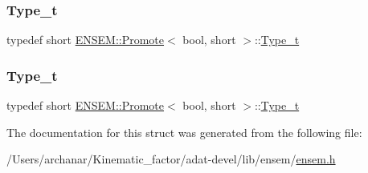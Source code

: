 \mbox{\label{structENSEM_1_1Promote_3_01bool_00_01short_01_4_a3a13222623387509ba3bc981fe9b2d4f}} 
\subsubsection{\texorpdfstring{Type\_t}{Type\_t}\hspace{0.1cm}{\footnotesize\ttfamily [2/3]}}
{\footnotesize\ttfamily typedef short \mbox{\hyperlink{structENSEM_1_1Promote}{E\+N\+S\+E\+M\+::\+Promote}}$<$ bool, short $>$\+::\mbox{\hyperlink{structENSEM_1_1Promote_3_01bool_00_01short_01_4_a3a13222623387509ba3bc981fe9b2d4f}{Type\+\_\+t}}}

\mbox{\label{structENSEM_1_1Promote_3_01bool_00_01short_01_4_a3a13222623387509ba3bc981fe9b2d4f}} 
\subsubsection{\texorpdfstring{Type\_t}{Type\_t}\hspace{0.1cm}{\footnotesize\ttfamily [3/3]}}
{\footnotesize\ttfamily typedef short \mbox{\hyperlink{structENSEM_1_1Promote}{E\+N\+S\+E\+M\+::\+Promote}}$<$ bool, short $>$\+::\mbox{\hyperlink{structENSEM_1_1Promote_3_01bool_00_01short_01_4_a3a13222623387509ba3bc981fe9b2d4f}{Type\+\_\+t}}}



The documentation for this struct was generated from the following file\+:\begin{DoxyCompactItemize}
\item 
/\+Users/archanar/\+Kinematic\+\_\+factor/adat-\/devel/lib/ensem/\mbox{\hyperlink{adat-devel_2lib_2ensem_2ensem_8h}{ensem.\+h}}\end{DoxyCompactItemize}
